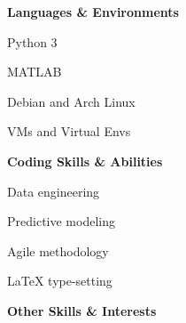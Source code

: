 \documentclass[letterpaper,final]{memoir}
\newcommand{\Sep}{\vspace{1.0em}}
\newcommand{\SmallSep}{\vspace{0.4em}}
\newcommand{\CVItem}[1]
	{\textbf{\color{Blue} #1}}
\begin{document}
\Sep

\CVItem{Languages \& Environments}

\SmallSep

\begin{multicols}{4}

    \begin{compactitem}[\color{Blue}$\circ$]
		
		\item Python 3
        \SmallSep
        
        \item MATLAB
		\SmallSep
        
        \item Debian and Arch Linux
        \SmallSep

        \item VMs and Virtual Envs
    
	\end{compactitem}

\end{multicols}

\Sep

\CVItem{Coding Skills \& Abilities}

\SmallSep

\begin{multicols}{4}

    \begin{compactitem}[\color{Blue}$\circ$]

        \item Data engineering
        \SmallSep

        \item Predictive modeling
        \SmallSep
   
        \item Agile methodology
        \SmallSep

        \item LaTeX type-setting
        
        
	\end{compactitem}

\end{multicols}

\Sep

\CVItem{Other Skills \& Interests}

\SmallSep
\end{document}
